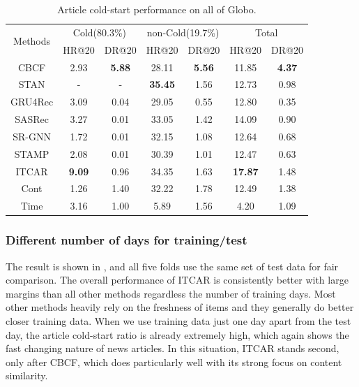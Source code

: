 \begin{table}[th]\setlength{\tabcolsep}{2.4pt}
\caption{Article cold-start performance on all of Globo.}
\label{tb:cold-start}
\centering
\begin{tabular}{c|c|c|c|c|c|c}
 \toprule
 \multirow{2}{*}{Methods}  & \multicolumn{2}{c|}{Cold(80.3\%)} & \multicolumn{2}{c|}{non-Cold(19.7\%)} & \multicolumn{2}{c}{Total} \\ \cline{2-7} 
   & HR@20 & DR@20 & HR@20 & DR@20 & HR@20 & DR@20    \\ 
 \midrule
 CBCF & 2.93  & \textbf{5.88}  & 28.11 & \textbf{5.56} & 11.85 & \textbf{4.37} \\
 STAN & -  & - &  \textbf{35.45}  & 1.56 & 12.73  &  0.98  \\ 
 \midrule
 GRU4Rec & 3.09  & 0.04  & 29.05 & 0.55 & 12.80 & 0.35 \\
 SASRec & 3.27 & 0.01  & 33.05 & 1.42 & 14.09 & 0.90 \\
 SR-GNN & 1.72 & 0.01  & 32.15  & 1.08 & 12.64 & 0.68 \\ 
 STAMP & 2.08 & 0.01 & 30.39 & 1.01 & 12.47 & 0.63  \\
 \midrule
 ITCAR & \textbf{9.09} & 0.96 & 34.35 & 1.63 & \textbf{17.87} & 1.48 \\
 Cont & 1.26 & 1.40 & 32.22 & 1.78 & 12.49 & 1.38 \\
 Time & 3.16 & 1.00 & 5.89 & 1.56 & 4.20 & 1.09 \\
 \bottomrule
\end{tabular}
\end{table}

\subsubsection{Different number of days for training/test}
\label{sec:robo}
The result is shown in , and all five folds use the same set of 
test data for fair comparison. The overall performance of ITCAR is consistently 
better with large margins than all other methods regardless the number of training days. 
Most other methods heavily rely on the freshness of items and they generally 
do better closer training data. When we use training data just one day apart from 
the test day, the article cold-start ratio is already extremely high, 
which again shows the fast changing nature of news articles. 
In this situation, ITCAR stands second, only after CBCF,
which does particularly well with its strong focus on content similarity. 

